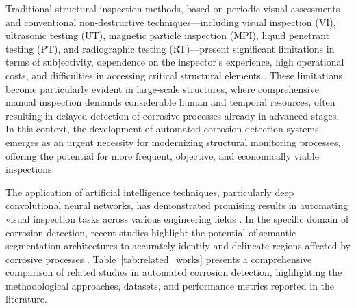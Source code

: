 \documentclass[Journal,letterpaper]{ascelike-new}
\begin{document}
Traditional structural inspection methods, based on periodic visual assessments and conventional non-destructive techniques---including visual inspection (VI), ultrasonic testing (UT), magnetic particle inspection (MPI), liquid penetrant testing (PT), and radiographic testing (RT)---present significant limitations in terms of subjectivity, dependence on the inspector's experience, high operational costs, and difficulties in accessing critical structural elements \cite{melchers2018structural,li2023realtime}. These limitations become particularly evident in large-scale structures, where comprehensive manual inspection demands considerable human and temporal resources, often resulting in delayed detection of corrosive processes already in advanced stages. In this context, the development of automated corrosion detection systems emerges as an urgent necessity for modernizing structural monitoring processes, offering the potential for more frequent, objective, and economically viable inspections.

The application of artificial intelligence techniques, particularly deep convolutional neural networks, has demonstrated promising results in automating visual inspection tasks across various engineering fields \cite{lecun2015deep,cha2017deep}. In the specific domain of corrosion detection, recent studies highlight the potential of semantic segmentation architectures to accurately identify and delineate regions affected by corrosive processes \cite{atha2018evaluation,forkan2022corodnet,nash2018automated}. Table~\ref{tab:related_works} presents a comprehensive comparison of related studies in automated corrosion detection, highlighting the methodological approaches, datasets, and performance metrics reported in the literature.
\end{document}
